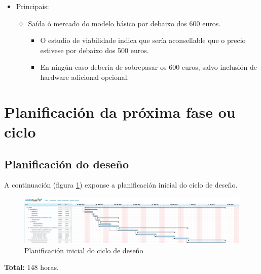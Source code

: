 \begin{itemize}
\begin{itemize}
          \item Principais:
                \begin{itemize}
                 \item Saída ó mercado do modelo básico por debaixo dos 600
                       euros.
                       \begin{itemize}
                        \item O estudio de viabilidade indica que sería
                              aconsellable que o precio estivese por debaixo
                              dos 500 euros.
                        \item En ningún caso debería de sobrepasar os 600
                              euros, salvo inclusión de hardware adicional
                              opcional.
                       \end{itemize}
                \end{itemize}
         \end{itemize}
  \end{itemize}

\section{Planificación da próxima fase ou ciclo}

 \subsection{Planificación do deseño}

 A continuación (figura \ref{figura:PlanificacionInicialDeseno}) exponse a
 planificación inicial do ciclo de deseño. \\

 \begin{figure}[htbp]
  \centering
  \includegraphics[trim=0 0 48cm 0,clip=true,scale=0.7,keepaspectratio=true]{./imagenes/deseno.png}
  \caption{Planificación inicial do ciclo de deseño}
  \label{figura:PlanificacionInicialDeseno}
 \end{figure}

 \textbf{Total:} 148 horas.